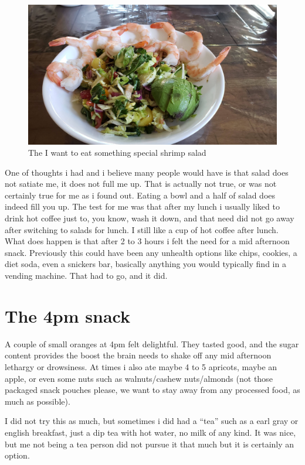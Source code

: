 \documentclass[oneside]{book}
\begin{document}
\begin{figure}
\centering
\includegraphics{pictures/shrimp-salad.jpg}
\caption{The I want to eat something special shrimp salad}
\end{figure}

One of thoughts i had and i believe many people would have is that salad
does not satiate me, it does not full me up. That is actually not true,
or was not certainly true for me as i found out. Eating a bowl and a
half of salad does indeed fill you up. The test for me was that after my
lunch i usually liked to drink hot coffee just to, you know, wash it
down, and that need did not go away after switching to salads for lunch.
I still like a cup of hot coffee after lunch. What does happen is that
after 2 to 3 hours i felt the need for a mid afternoon snack. Previously
this could have been any unhealth options like chips, cookies, a diet
soda, even a snickers bar, basically anything you would typically find
in a vending machine. That had to go, and it did.

\section{The 4pm snack}\label{the-4pm-snack}

A couple of small oranges at 4pm felt delightful. They tasted good, and
the sugar content provides the boost the brain needs to shake off any
mid afternoon lethargy or drowsiness. At times i also ate maybe 4 to 5
apricots, maybe an apple, or even some nuts such as walnuts/cashew
nuts/almonds (not those packaged snack pouches please, we want to stay
away from any processed food, as much as possible).

I did not try this as much, but sometimes i did had a ``tea'' such as a
earl gray or english breakfast, just a dip tea with hot water, no milk
of any kind. It was nice, but me not being a tea person did not pursue
it that much but it is certainly an option.
\end{document}
